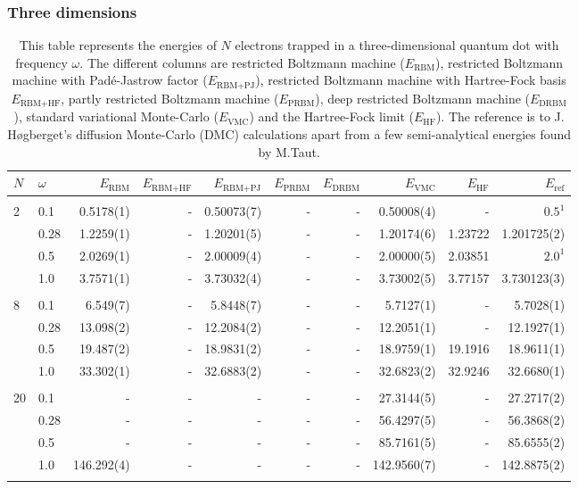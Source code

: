 \begin{landscape}
\subsubsection{Three dimensions}
\begin{table} [H]
	\caption{This table represents the energies of $N$ electrons trapped in a three-dimensional quantum dot with frequency $\omega$. The different columns are restricted Boltzmann machine ($E_{\text{RBM}}$), restricted Boltzmann machine with Padé-Jastrow factor ($E_{\text{RBM+PJ}}$), restricted Boltzmann machine with Hartree-Fock basis $E_{\text{RBM+HF}}$, partly restricted Boltzmann machine ($E_{\text{PRBM}}$), deep restricted Boltzmann machine ($E_{\text{DRBM}}$), standard variational Monte-Carlo ($E_{\text{VMC}}$) and the Hartree-Fock limit ($E_{\text{HF}}$). The reference is to J. Høgberget's diffusion Monte-Carlo (DMC) calculations apart from a few semi-analytical energies found by M.Taut. \cite{taut_two_1993}\cite{hogberget_quantum_2013}} 
	\begin{tabularx}{\hsize}{l:l|RRRRRRRR} \hline\hline
		\label{tab:quantumdotswinteraction3D1}
		$N$ & $\omega$ & $E_{\text{RBM}}$ & $E_{\text{RBM+HF}}$ & $E_{\text{RBM+PJ}}$ & $E_{\text{PRBM}}$ & $E_{\text{DRBM}}$ & $E_{\text{VMC}}$ & $E_{\text{HF}} $ & $E_{\text{ref}}$ \\ \hline \\
		2 & 0.1 & 0.5178(1) & - & 0.50073(7) & - & - & 0.50008(4) & - & $0.5^{1}$ \\
		& 0.28 & 1.2259(1) & - & 1.20201(5) & - & - & 1.20174(6) & 1.23722 & 1.201725(2) \\
		& 0.5 & 2.0269(1) & - & 2.00009(4) & - & - & 2.00000(5) & 2.03851 & $2.0^{1}$ \\
		& 1.0 & 3.7571(1) & - & 3.73032(4) & - & - & 3.73002(5) & 3.77157 & 3.730123(3) \\ \hdashline \\
		
		8 & 0.1 & 6.549(7) & - & 5.8448(7) & - & - & 5.7127(1) & - & 5.7028(1) \\ 
		& 0.28 & 13.098(2) & - & 12.2084(2) & - & - & 12.2051(1) & - & 12.1927(1) \\
		& 0.5 & 19.487(2) & - & 18.9831(2) & - & - & 18.9759(1) & 19.1916 & 18.9611(1) \\
		& 1.0 & 33.302(1) & - & 32.6883(2) & - & - & 32.6823(2) & 32.9246 & 32.6680(1) \\ \hdashline \\
		
		20 & 0.1 & - & - & - & - & - & 27.3144(5) & - & 27.2717(2) \\ 
		& 0.28 & - & - & - & - & - & 56.4297(5) & - & 56.3868(2) \\
		& 0.5 & - & - & - & - & - & 85.7161(5) & - & 85.6555(2) \\
		& 1.0 & 146.292(4) & - & - & - & - & 142.9560(7) & - & 142.8875(2) \\ \hdashline 
	\end{tabularx}
\end{table}


\end{landscape}
